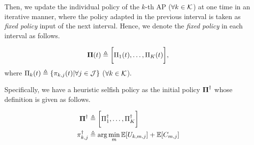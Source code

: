 Then, we update the individual policy of the $k$-th AP ($\forall k\in\mathcal{K}$) at one time in an iterative manner, where the policy adapted in the previous interval is taken as \emph{fixed policy} input of the next interval.
Hence, we denote the \emph{fixed policy} in each interval as follows.
\begin{definition}
    \begin{align}
        \boldsymbol{\Pi}(t) \triangleq \bigg[\Pi_{1}(t), \dots, \Pi_{K}(t)\bigg],
    \end{align}
    where $\Pi_{k}(t) \triangleq \{\pi_{k,j}(t) | \forall j\in\mathcal{J}\}$ ($\forall k\in\mathcal{K}$).
\end{definition}
Specifically, we have a heuristic selfish policy as the initial policy $\boldsymbol{\Pi}^{\dagger}$ whose definition is given as follows.
\begin{definition}
    \begin{align}
        \boldsymbol{\Pi}^{\dagger} &\triangleq \bigg[ \Pi^{\dagger}_{1}, \dots, \Pi^{\dagger}_{K} \bigg]
        \\
        \pi^{\dagger}_{k,j} &\triangleq \arg\min_{m} \mathbb{E}[U_{k,m,j}] + \mathbb{E}[C_{m,j}]
    \end{align}
\end{definition}

